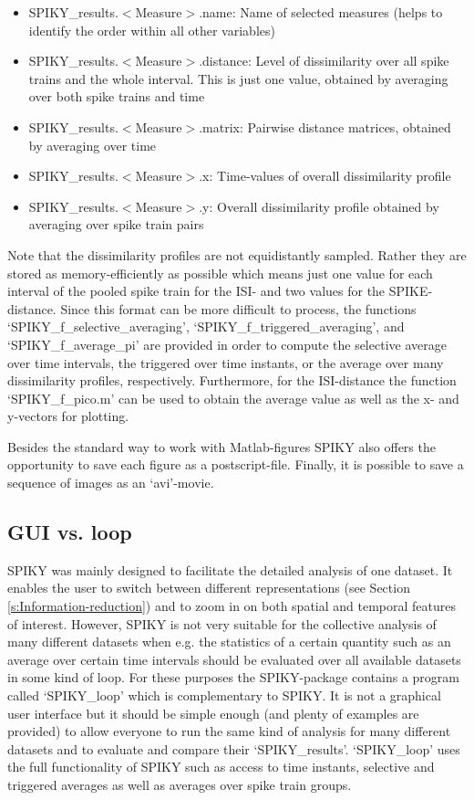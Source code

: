 \documentclass[10pt,twocolumn]{elsart5p}
\begin{document}
\begin{itemize}
\item SPIKY\_results.$<$Measure$>$.name: Name of selected measures (helps to identify the order within all other variables)
\item SPIKY\_results.$<$Measure$>$.distance: Level of dissimilarity over all spike trains and the whole interval. This is just one value, obtained by averaging over both spike trains and time
\item SPIKY\_results.$<$Measure$>$.matrix: Pairwise distance matrices, obtained by averaging over time
\item SPIKY\_results.$<$Measure$>$.x: Time-values of overall dissimilarity profile
\item SPIKY\_results.$<$Measure$>$.y: Overall dissimilarity profile obtained by averaging over spike train pairs
\end{itemize}

Note that the dissimilarity profiles are not equidistantly sampled. Rather they are stored as memory-efficiently as possible which means just one value for each interval of the pooled spike train for the ISI- and two values for the SPIKE-distance. Since this format can be more difficult to process, the functions `SPIKY\_f\_selective\_averaging', `SPIKY\_f\_triggered\_averaging', and `SPIKY\_f\_average\_pi' are provided in order to compute the selective average over time intervals, the triggered over time instants, or the average over many dissimilarity profiles, respectively. Furthermore, for the ISI-distance the function `SPIKY\_f\_pico.m' can be used to obtain the average value as well as the x- and y-vectors for plotting.

Besides the standard way to work with Matlab-figures SPIKY also offers the opportunity to save each figure as a postscript-file. Finally, it is possible to save a sequence of images as an `avi'-movie.


\subsection{\label{ss:GUI-vs-loop} GUI vs. loop}

SPIKY was mainly designed to facilitate the detailed analysis of one dataset. It enables the user to switch between different representations (see Section \ref{s:Information-reduction}) and to zoom in on both spatial and temporal features of interest. However, SPIKY is not very suitable for the collective analysis of many different datasets when e.g. the statistics of a certain quantity such as an average over certain time intervals should be evaluated over all available datasets in some kind of loop. For these purposes the SPIKY-package contains a program called `SPIKY\_loop' which is complementary to SPIKY. It is not a graphical user interface but it should be simple enough (and plenty of examples are provided) to allow everyone to run the same kind of analysis for many different datasets and to evaluate and compare their `SPIKY\_results'. `SPIKY\_loop' uses the full functionality of SPIKY such as access to time instants, selective and triggered averages as well as averages over spike train groups.
\end{document}
